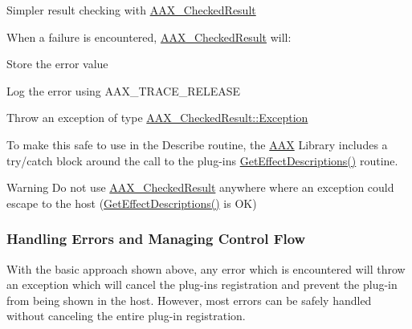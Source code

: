 \begin{DoxyCode}{0}
\end{DoxyCode}
 Simpler result checking with \mbox{\hyperlink{a01601}{A\+A\+X\+\_\+\+Checked\+Result}}

 When a failure is encountered, \mbox{\hyperlink{a01601}{A\+A\+X\+\_\+\+Checked\+Result}} will\+:
\begin{DoxyItemize}
\item Store the error value
\item Log the error using A\+A\+X\+\_\+\+T\+R\+A\+C\+E\+\_\+\+R\+E\+L\+E\+A\+SE
\item Throw an exception of type \mbox{\hyperlink{a01601_a36fd71afc6d62993c1dd96e1ca9fcc0e}{A\+A\+X\+\_\+\+Checked\+Result\+::\+Exception}}
\end{DoxyItemize}

 To make this safe to use in the Describe routine, the \mbox{\hyperlink{a00852}{A\+AX}} Library includes a try/catch block around the call to the plug-\/in\textquotesingle{}s {\ttfamily \mbox{\hyperlink{a00796_gae0d356eef326f77cbb972e48946d4892}{Get\+Effect\+Descriptions()}}} routine.

 \begin{DoxyWarning}{Warning}
Do not use \mbox{\hyperlink{a01601}{A\+A\+X\+\_\+\+Checked\+Result}} anywhere where an exception could escape to the host (\mbox{\hyperlink{a00796_gae0d356eef326f77cbb972e48946d4892}{Get\+Effect\+Descriptions()}} is OK)
\end{DoxyWarning}
\hypertarget{a00796_describe_checking_results_handling_errors}{}\subsubsection{Handling Errors and Managing Control Flow}\label{a00796_describe_checking_results_handling_errors}
 With the basic approach shown above, any error which is encountered will throw an exception which will cancel the plug-\/in\textquotesingle{}s registration and prevent the plug-\/in from being shown in the host. However, most errors can be safely handled without canceling the entire plug-\/in registration.


